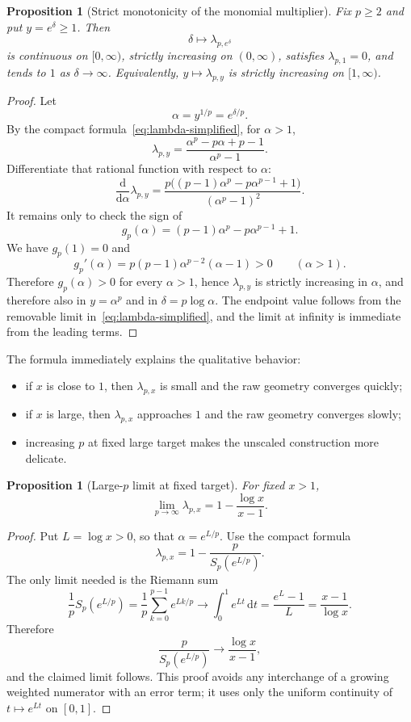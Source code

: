 \documentclass[10pt,a4paper]{article}
\theoremstyle{plain}
\newtheorem{proposition}[theorem]{Proposition}
\theoremstyle{definition}
\theoremstyle{remark}
\newcommand{\dd}{\mathrm{d}}
\begin{document}
\begin{proposition}[Strict monotonicity of the monomial multiplier]
\label{prop:lambda-monotone}
Fix $p\ge2$ and put $y=e^\delta\ge1$.  Then
\[
  \delta\longmapsto \lambda_{p,e^\delta}
\]
is continuous on $[0,\infty)$, strictly increasing on $(0,\infty)$, satisfies
$\lambda_{p,1}=0$, and tends to $1$ as $\delta\to\infty$.  Equivalently,
$y\mapsto\lambda_{p,y}$ is strictly increasing on $[1,\infty)$.
\end{proposition}

\begin{proof}
Let
\[
  \alpha=y^{1/p}=e^{\delta/p}.
\]
By the compact formula~\eqref{eq:lambda-simplified}, for $\alpha>1$,
\[
  \lambda_{p,y}
  =\frac{\alpha^p-p\alpha+p-1}{\alpha^p-1}.
\]
Differentiate that rational function with respect to $\alpha$:
\[
  \frac{\dd}{\dd\alpha}\lambda_{p,y}
  =\frac{p\bigl((p-1)\alpha^p-p\alpha^{p-1}+1\bigr)}
         {(\alpha^p-1)^2}.
\]
It remains only to check the sign of
\[
  g_p(\alpha)=(p-1)\alpha^p-p\alpha^{p-1}+1.
\]
We have $g_p(1)=0$ and
\[
  g_p'(\alpha)=p(p-1)\alpha^{p-2}(\alpha-1)>0
  \qquad(\alpha>1).
\]
Therefore $g_p(\alpha)>0$ for every $\alpha>1$, hence
$\lambda_{p,y}$ is strictly increasing in $\alpha$, and therefore also in
$y=\alpha^p$ and in $\delta=p\log\alpha$.  The endpoint value follows from the
removable limit in~\eqref{eq:lambda-simplified}, and the limit at infinity is
immediate from the leading terms.
\end{proof}

The formula immediately explains the qualitative behavior:

\begin{itemize}
  \item if $x$ is close to $1$, then $\lambda_{p,x}$ is small and the raw
  geometry converges quickly;
  \item if $x$ is large, then $\lambda_{p,x}$ approaches $1$ and the raw
  geometry converges slowly;
  \item increasing $p$ at fixed large target makes the unscaled construction
  more delicate.
\end{itemize}

\begin{proposition}[Large-$p$ limit at fixed target]
For fixed $x>1$,
\[
  \lim_{p\to\infty}\lambda_{p,x}
  =1-\frac{\log x}{x-1}.
\]
\end{proposition}

\begin{proof}
Put $L=\log x>0$, so that $\alpha=e^{L/p}$.  Use the compact formula
\[
  \lambda_{p,x}=1-\frac{p}{S_p(e^{L/p})}.
\]
The only limit needed is the Riemann sum
\[
  \frac{1}{p}S_p(e^{L/p})
  =\frac1p\sum_{k=0}^{p-1} e^{Lk/p}
  \longrightarrow \int_0^1 e^{Lt}\,\dd t
  =\frac{e^L-1}{L}
  =\frac{x-1}{\log x}.
\]
Therefore
\[
  \frac{p}{S_p(e^{L/p})}
  \longrightarrow
  \frac{\log x}{x-1},
\]
and the claimed limit follows.  This proof avoids any interchange of a growing
weighted numerator with an error term; it uses only the uniform continuity of
$t\mapsto e^{Lt}$ on $[0,1]$.
\end{proof}
\end{document}
